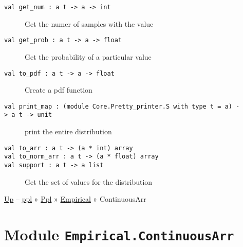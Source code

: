 \begin{description}
\item[{\protect\hyperlink{val-getux5fnum}{}\texttt{val\ get\_num\ :\ \textquotesingle{}a\ t\ -\textgreater{}\ \textquotesingle{}a\ -\textgreater{}\ int}}]
Get the numer of samples with the value
\end{description}

\begin{description}
\item[{\protect\hyperlink{val-getux5fprob}{}\texttt{val\ get\_prob\ :\ \textquotesingle{}a\ t\ -\textgreater{}\ \textquotesingle{}a\ -\textgreater{}\ float}}]
Get the probability of a particular value
\end{description}

\begin{description}
\item[{\protect\hyperlink{val-toux5fpdf}{}\texttt{val\ to\_pdf\ :\ \textquotesingle{}a\ t\ -\textgreater{}\ \textquotesingle{}a\ -\textgreater{}\ float}}]
Create a pdf function
\end{description}

\begin{description}
\item[{\protect\hyperlink{val-printux5fmap}{}\texttt{val\ print\_map\ :\ (module\ Core.Pretty\_printer.S\ with\ type\ t\ =\ \textquotesingle{}a)\ -\textgreater{}\ \textquotesingle{}a\ t\ -\textgreater{}\ unit}}]
print the entire distribution
\end{description}

\begin{description}
\item[{\protect\hyperlink{val-toux5farr}{}\texttt{val\ to\_arr\ :\ \textquotesingle{}a\ t\ -\textgreater{}\ (\textquotesingle{}a\ *\ int)\ array}\\
\protect\hyperlink{val-toux5fnormux5farr}{}\texttt{val\ to\_norm\_arr\ :\ \textquotesingle{}a\ t\ -\textgreater{}\ (\textquotesingle{}a\ *\ float)\ array}\\
\protect\hyperlink{val-support}{}\texttt{val\ support\ :\ \textquotesingle{}a\ t\ -\textgreater{}\ \textquotesingle{}a\ list}}]
Get the set of values for the distribution
\end{description}

\href{../index.html}{Up} -- \href{../../../index.html}{ppl} »
\href{../../index.html}{Ppl} » \href{../index.html}{Empirical} »
ContinuousArr

\section{\texorpdfstring{Module
\texttt{Empirical.ContinuousArr}}{Module Empirical.ContinuousArr}}\label{module-empirical.continuousarr}

